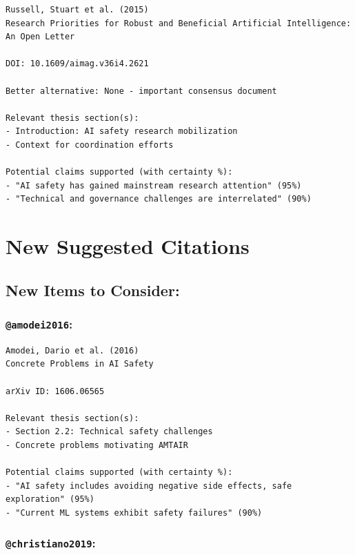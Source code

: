 \documentclass[
  11pt,
  letterpaper,
]{book}
\begin{document}
\begin{verbatim}
Russell, Stuart et al. (2015)
Research Priorities for Robust and Beneficial Artificial Intelligence: An Open Letter

DOI: 10.1609/aimag.v36i4.2621

Better alternative: None - important consensus document

Relevant thesis section(s):
- Introduction: AI safety research mobilization
- Context for coordination efforts

Potential claims supported (with certainty %):
- "AI safety has gained mainstream research attention" (95%)
- "Technical and governance challenges are interrelated" (90%)
\end{verbatim}

\section*{New Suggested Citations}\label{new-suggested-citations}


\subsection*{New Items to Consider:}\label{new-items-to-consider}

\subsubsection*{\texorpdfstring{\texttt{@amodei2016}:
\textcite{amodei2016}}{@amodei2016: @amodei2016}}\label{amodei2016-amodei2016}

\begin{verbatim}
Amodei, Dario et al. (2016)
Concrete Problems in AI Safety

arXiv ID: 1606.06565

Relevant thesis section(s):
- Section 2.2: Technical safety challenges
- Concrete problems motivating AMTAIR

Potential claims supported (with certainty %):
- "AI safety includes avoiding negative side effects, safe exploration" (95%)
- "Current ML systems exhibit safety failures" (90%)
\end{verbatim}

\subsubsection*{\texorpdfstring{\texttt{@christiano2019}:
\textcite{christiano2019}}{@christiano2019: @christiano2019}}\label{christiano2019-christiano2019}
\end{document}
